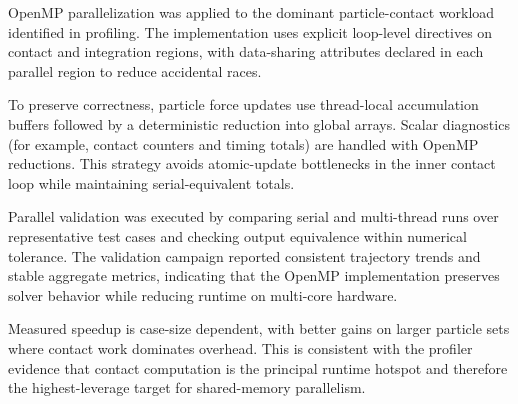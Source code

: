 OpenMP parallelization was applied to the dominant particle-contact workload identified in profiling. The implementation uses explicit loop-level directives on contact and integration regions, with data-sharing attributes declared in each parallel region to reduce accidental races.

To preserve correctness, particle force updates use thread-local accumulation buffers followed by a deterministic reduction into global arrays. Scalar diagnostics (for example, contact counters and timing totals) are handled with OpenMP reductions. This strategy avoids atomic-update bottlenecks in the inner contact loop while maintaining serial-equivalent totals.

Parallel validation was executed by comparing serial and multi-thread runs over representative test cases and checking output equivalence within numerical tolerance. The validation campaign reported consistent trajectory trends and stable aggregate metrics, indicating that the OpenMP implementation preserves solver behavior while reducing runtime on multi-core hardware.

Measured speedup is case-size dependent, with better gains on larger particle sets where contact work dominates overhead. This is consistent with the profiler evidence that contact computation is the principal runtime hotspot and therefore the highest-leverage target for shared-memory parallelism.
